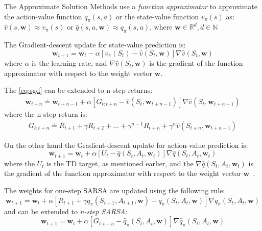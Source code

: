 \documentclass[../xlapes02]{subfiles}
\begin{document}
    The Approximate Solution Methods use a \emph{function approximator} to approximate the action-value function $q_\pi(s,a)$ or the state-value function $v_\pi(s)$ as:
    $\hat{v}(s,\bm{w})\approx v_{\pi}(s)$ or $\hat{q}(s,a,\bm{w})\approx q_{\pi}(s,a)$, where $\bm{w}\in\mathbb{R}^d,d\in\mathbb{N}$

    The Gradient-descent update for state-value prediction is:
    \begin{equation}
        \label{eq:sgd}
        \bm{w}_{t+1}=\bm{w}_t-\alpha\left[v_\pi(S_t)-\hat{v}(S_t, \bm{w})\right]\nabla \hat{v}(S_t, \bm{w})
    \end{equation}
    where $\alpha$ is the learning rate, and $\nabla \hat{v}(S_t, \bm{w})$ is the gradient of the function approximator with respect to the weight vector $\bm{w}$.

    The \cref{eq:sgd} can be extended to n-step returns:
    \begin{equation}
        \begin{split}
            \bm{w}_{t+n}\doteq\bm{w}_{t+n-1}+\alpha\left[G_{t:t+n}-\hat{v}(S_t,\bm{w}_{t+n-1})\right]\nabla\hat{v}(S_t,\bm{w}_{t+n-1})
        \end{split}
    \end{equation}
    where the n-step return is:
    \begin{equation}
        \begin{split}
            G_{t:t+n}\doteq R_{t+1}+\gamma R_{t+2}+\dots+\gamma^{n-1}R_{t+n}+\gamma^n\hat{v}(S_{t+n},\bm{w}_{t+n-1})
        \end{split}
    \end{equation}

    On the other hand the Gradient-descent update for action-value prediction is:
    \begin{equation}
        \bm{w}_{t+1}=\bm{w}_t+\alpha \left[U_t-\hat{q}(S_t,A_t,\bm{w}_t)\right]\nabla \hat{q}(S_t,A_t,\bm{w}_t)
    \end{equation}
    where the $U_t$ is the TD target, as mentioned earlier, and the $\nabla \hat{q}(S_t,A_t,\bm{w}_t)$ is the gradient of the function approximator with respect to the weight vector $\bm{w}$~\cite{sutton2018reinforcement}.

    The weights for one-step SARSA are updated using the following rule:
    \begin{equation}
        \bm{w}_{t+1}=\bm{w}_t+\alpha\left[R_{t+1}+\gamma q_{\pi}(S_{t+1},A_{t+1},\bm{w})-q_{\pi}(S_t,A_t,\bm{w})\right]\nabla q_{\pi}(S_t,A_t,\bm{w})
    \end{equation}
    and can be extended to \emph{n-step SARSA}:
    \begin{equation}
        \bm{w}_{t+1}=\bm{w}_t+\alpha\left[G_{t:t+n}-\hat{q}_{\pi}(S_t,A_t,\bm{w})\right]\nabla\hat{q}_{\pi}(S_t,A_t,\bm{w})
    \end{equation}
\end{document}
